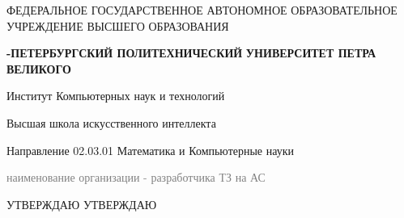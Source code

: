 \documentclass[12pt,a4paper]{article}
\begin{document}
\def\contentsname{ОГЛАВЛЕНИЕ}
\thispagestyle{empty}
\begin{center}
\vspace{0.3cm}
\normalsize
{ФЕДЕРАЛЬНОЕ ГОСУДАРСТВЕННОЕ АВТОНОМНОЕ ОБРАЗОВАТЕЛЬНОЕ УЧРЕЖДЕНИЕ ВЫСШЕГО ОБРАЗОВАНИЯ} \par
    \textbf{-ПЕТЕРБУРГСКИЙ ПОЛИТЕХНИЧЕСКИЙ}
    \textbf{УНИВЕРСИТЕТ ПЕТРА ВЕЛИКОГО\guillemotright} \par
    {Институт Компьютерных наук и технологий}\par
    {Высшая школа искусственного интеллекта}\par
    {Направление 02.03.01 Математика и Компьютерные науки}
\end{center}
\vspace{-0.6cm}
\hrulefill
\vspace{-0.4cm}
\begin{center}
   \textcolor{gray}{\footnotesize{наименование организации - разработчика ТЗ на АС}}
\end{center}
\vfill
\begin{center}
    УТВЕРЖДАЮ \hspace{5.5cm} УТВЕРЖДАЮ
\end{center}
\end{document}
